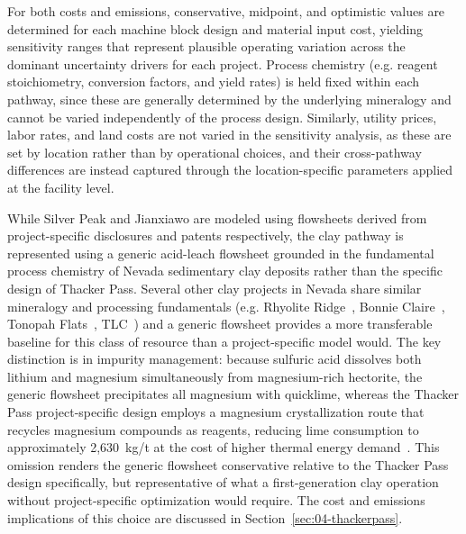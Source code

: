 For both costs and emissions, conservative, midpoint, and optimistic values are determined for each machine block design and material input cost, yielding sensitivity ranges that represent plausible operating variation across the dominant uncertainty drivers for each project. Process chemistry (e.g. reagent stoichiometry, conversion factors, and yield rates) is held fixed within each pathway, since these are generally determined by the underlying mineralogy and cannot be varied independently of the process design. Similarly, utility prices, labor rates, and land costs are not varied in the sensitivity analysis, as these are set by location rather than by operational choices, and their cross-pathway differences are instead captured through the location-specific parameters applied at the facility level.

While Silver Peak and Jianxiawo are modeled using flowsheets derived from project-specific disclosures and patents respectively, the clay pathway is represented using a generic acid-leach flowsheet grounded in the fundamental process chemistry of Nevada sedimentary clay deposits rather than the specific design of Thacker Pass. Several other clay projects in Nevada share similar mineralogy and processing fundamentals (e.g. Rhyolite Ridge~\cite{fluorenterprisesRhyoliteRidgeLithiumBoron2022}, Bonnie Claire~\cite{samariMineralResourceEstimate2024}, Tonopah Flats~\cite{dyerAmendedResourceEstimate}, TLC~\cite{riordanFalchaniLithiumProject2024}) and a generic flowsheet provides a more transferable baseline for this class of resource than a project-specific model would. The key distinction is in impurity management: because sulfuric acid dissolves both lithium and magnesium simultaneously from magnesium-rich hectorite, the generic flowsheet precipitates all magnesium with quicklime, whereas the Thacker Pass project-specific design employs a magnesium crystallization route that recycles magnesium compounds as reagents, reducing lime consumption to approximately 2,630~kg/t at the cost of higher thermal energy demand~\cite{sgscanadaincSK1300Technical2024}. This omission renders the generic flowsheet conservative relative to the Thacker Pass design specifically, but representative of what a first-generation clay operation without project-specific optimization would require. The cost and emissions implications of this choice are discussed in Section~\ref{sec:04-thackerpass}.

